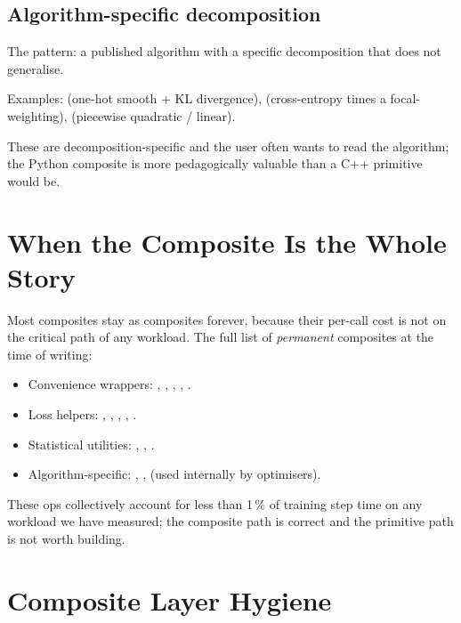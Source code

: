 \subsection{Algorithm-specific decomposition}
\label{ssec:composite_ops:algo_specific}

The pattern: a published algorithm with a specific decomposition
that does not generalise.

Examples:  (one-hot smooth +
KL divergence),  (cross-entropy times a
focal-weighting),  (piecewise quadratic /
linear).

These are decomposition-specific and the user often wants to read
the algorithm; the Python composite is more pedagogically valuable
than a C++ primitive would be.

\section{When the Composite Is the Whole Story}
\label{sec:composite_ops:whole_story}

Most composites stay as composites forever, because their per-call
cost is not on the critical path of any workload. The full list of
\emph{permanent} composites at the time of writing:

\begin{itemize}
  \item Convenience wrappers: ,
    , , ,
    .
  \item Loss helpers: , ,
    , ,
    .
  \item Statistical utilities: ,
    ,
    .
  \item Algorithm-specific: ,
    ,  (used internally
    by optimisers).
\end{itemize}

These ops collectively account for less than 1\,\% of training
step time on any workload we have measured; the composite path is
correct and the primitive path is not worth building.

\section{Composite Layer Hygiene}
\label{sec:composite_ops:hygiene}

